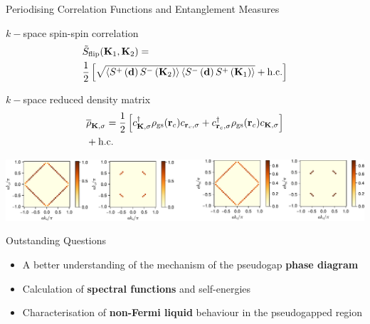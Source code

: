 \documentclass[11pt,aspectratio=169]{beamer}
\newcommand\focus[1]{%
	{\alert{\textbf{#1}}}
}
\begin{document}
\begin{frame}{Periodising Correlation Functions and Entanglement Measures}
	\begin{minipage}{0.49\textwidth}
	\(k-\)space spin-spin correlation
	\begin{equation*}\begin{aligned}
	&\tilde{S}_\text{flip}({\bf K}_1, {\bf K}_2) = \\
	&\frac{1}{2}\left[\sqrt{\braket{S^+\left({\bf d}\right)S^-\left({\bf K}_2\right)}\braket{S^-\left({\bf d}\right)S^+\left({\bf K}_1\right)}} + \text{h.c.}\right]
	\end{aligned}\end{equation*}
	\end{minipage}
	\begin{minipage}{0.49\textwidth}
	\(k-\)space reduced density matrix
	\begin{equation*}\begin{aligned}
		&\overline\rho_{{\bf K},\sigma} = \frac{1}{2}\left[c^\dagger_{{\bf K},\sigma} \rho_\text{gs}({\bf r}_c) c_{{\bf r}_c,\sigma} + c^\dagger_{{\bf r}_c,\sigma} \rho_\text{gs}({\bf r}_c) c_{{\bf K},\sigma}\right] \\
		& + \text{h.c.}
	\end{aligned}\end{equation*}
	\end{minipage}
	
	\vspace{\fill}
	\centering
	\includegraphics[width=\textwidth]{tilingEnt.pdf}
\end{frame}

\begin{frame}{Outstanding Questions}
	\begin{itemize}
		\item A better understanding of the mechanism of the pseudogap \focus{phase diagram}\\[10pt]
		\item Calculation of \focus{spectral functions} and self-energies\\[10pt]
		\item Characterisation of \focus{non-Fermi liquid} behaviour in the pseudogapped region
	\end{itemize}
\end{frame}
\end{document}
